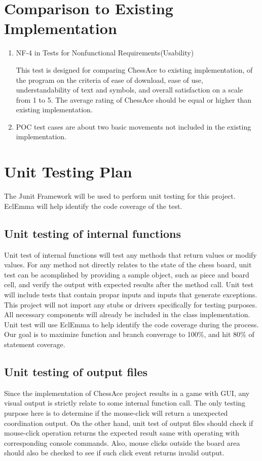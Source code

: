 \documentclass[12pt, titlepage]{article}
\begin{document}
\section{Comparison to Existing Implementation}
	
\begin{enumerate}
\item {NF-4 in Tests for Nonfunctional Requirements(Usability)}

This test is designed for comparing ChessAce to existing implementation, of the program on the criteria of ease of download, ease of use, understandability of text and symbols, and overall satisfaction on a scale from 1 to 5. The average rating of ChessAce should be equal or higher than existing implementation. 

\item POC test cases are about two basic movements not included in the existing implementation.
\end{enumerate}		
\newpage
\section{Unit Testing Plan}

The Junit Framework will be used to perform unit testing for this project. EclEmma will help identify the code coverage of the test.		

\subsection{Unit testing of internal functions}
Unit test of internal functions will test any methods that return values or modify values. For any method not directly relates to the state of the chess board, unit test can be acomplished by providing a sample object, such as piece and board cell, and verify the output with expected results after the method call. Unit test will include tests that contain propar inputs and inputs that generate exceptions. This project will not import any stubs or drivers specifically for testing purposes. All necessary components will already be included in the class implementation. Unit test will use EclEmma to help identify the code coverage during the process. Our goal is to maximize function and branch converage to 100\%, and hit 80\% of statement coverage.
\subsection{Unit testing of output files}		
Since the implementation of ChessAce project results in a game with GUI, any visual output is strictly relate to some internal function call. The only testing purpose here is to determine if the mouse-click will return a unexpected coordination output. On the other hand, unit test of output files should check if mouse-click operation returns the expected result same with operating with corresponding console commands. Also, mouse clicks outside the board area should also be checked to see if such click event returns invalid output.
\end{document}
